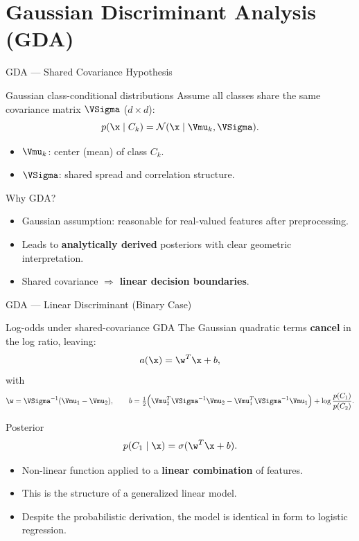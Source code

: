 \section{Gaussian Discriminant Analysis (GDA)}

\begin{frame}{GDA — Shared Covariance Hypothesis}
  \begin{block}{Gaussian class-conditional distributions}
    Assume all classes share the same covariance matrix $\VSigma$ ($d\times d$):
    \[
      p(\x\mid C_k)=\mathcal{N}(\x\mid\Vmu_k,\VSigma).
    \]
    \begin{itemize}
      \item $\Vmu_k$: center (mean) of class $C_k$.
      \item $\VSigma$: shared spread and correlation structure.
    \end{itemize}
  \end{block}

  \begin{alertblock}{Why GDA?}
    \begin{itemize}
      \item Gaussian assumption: reasonable for real-valued features after preprocessing.
      \item Leads to \textbf{analytically derived} posteriors with clear geometric interpretation.
      \item Shared covariance $\Rightarrow$ \textbf{linear decision boundaries}.
    \end{itemize}
  \end{alertblock}
\end{frame}

\begin{frame}{GDA — Linear Discriminant (Binary Case)}
  \begin{block}{Log-odds under shared-covariance GDA}
    The Gaussian quadratic terms \textbf{cancel} in the log ratio, leaving:
    \[
      a(\x)=\w^T\x+b,
    \]
    with
    \[
      \w=\VSigma^{-1}(\Vmu_1-\Vmu_2),
      \qquad
      b=\tfrac{1}{2}\!\left(\Vmu_2^T\VSigma^{-1}\Vmu_2
           -\Vmu_1^T\VSigma^{-1}\Vmu_1\right)+\log\frac{p(C_1)}{p(C_2)}.
    \]
  \end{block}

  \begin{block}{Posterior}
    \[
      p(C_1\mid\x)=\sigma(\w^T\x+b).
    \]
    \begin{itemize}
      \item Non-linear function applied to a \textbf{linear combination} of features.
      \item This is the structure of a \alert{generalized linear model}.
      \item Despite the probabilistic derivation, the model is identical in form to
            logistic regression.
    \end{itemize}
  \end{block}
\end{frame}

